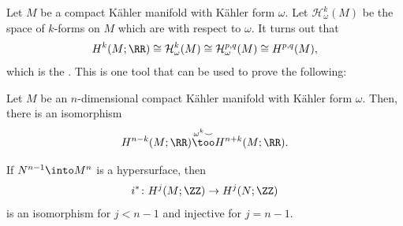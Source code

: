 \documentclass[10pt]{article}
\begin{document}
Let $M$ be a compact K\"ahler manifold with K\"ahler form $\omega$.
Let $\mathcal H^k_\omega(M)$ be the space of $k$-forms on $M$
which are  with respect to $\omega$.
It turns out that
\begin{equation*}
    H^k(M;\RR)\cong\mathcal H^k_\omega(M)\cong\mathcal H^{p,q}_\omega(M)
    \cong H^{p,q}(M),
\end{equation*}
which is the .
This is one tool that can be used to prove the following:
\begin{theorem}
    \label{thm:hard-lefschetz}
    Let $M$ be an $n$-dimensional compact K\"ahler manifold
    with K\"ahler form $\omega$. Then, there is an isomorphism
    \begin{equation*}
	H^{n-k}(M;\RR)\overset{\omega^k\smile}\too H^{n+k}(M;\RR).
    \end{equation*}
\end{theorem}

\begin{theorem}
    \label{thm:weak-lefschetz}
    If $N^{n-1}\into M^n$ is a hypersurface, then
    \begin{equation*}
        i^*\colon H^j(M;\ZZ)\to H^j(N;\ZZ)
    \end{equation*}
    is an isomorphism for $j<n-1$ and injective for $j=n-1$.
\end{theorem}
\end{document}

